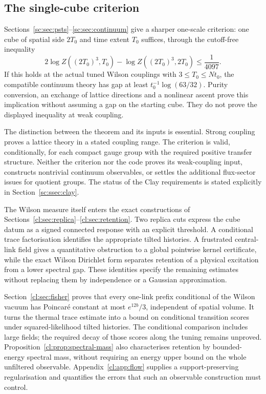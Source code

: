 \subsection{The single-cube criterion}
Sections~\ref{sc:sec:psts}--\ref{sc:sec:continuum}
give a sharper one-scale criterion: one cube of spatial side $2T_0$ and
time extent $T_0$ suffices, through the cutoff-free inequality
\[
2\log Z((2T_0)^3,T_0)-\log Z((2T_0)^3,2T_0)\le\frac1{4097}.
\]
If this holds at the actual tuned Wilson couplings with $3\le T_0\le Nt_0$,
the compatible continuum theory has gap at least
$t_0^{-1}\log(63/32)$. Purity conversion, an exchange of lattice directions
and a nonlinear ascent prove this implication without assuming a gap on
the starting cube. They do not prove the displayed inequality at weak
coupling.

The distinction between the theorem and its inputs is essential. Strong
coupling proves a lattice theory in a stated coupling range. The
criterion is valid, conditionally, for each compact gauge group with the
required positive transfer structure. Neither the criterion nor the code
proves its weak-coupling input, constructs nontrivial continuum observables,
or settles the additional flux-sector issues for quotient groups. The
status of the Clay requirements is stated explicitly in
Section~\ref{sc:ssec:clay}.

The Wilson measure itself enters the exact constructions of
Sections~\ref{cl:sec:replica}--\ref{cl:sec:retention}. Two replica cuts
express the cube datum as a signed connected response with an explicit
threshold. A conditional trace factorisation identifies the appropriate
tilted histories. A frustrated central-link field gives a quantitative
obstruction to a global pointwise kernel certificate, while the exact
Wilson Dirichlet form separates retention of a physical excitation from
a lower spectral gap. These identities specify the remaining estimates
without replacing them by independence or a Gaussian approximation.


Section~\ref{cl:sec:fisher} proves that every one-link prefix conditional
of the Wilson vacuum has Poincar\'e constant at most $e^{12b}/3$, independent
of spatial volume. It turns the thermal trace estimate into a bound on
conditional transition scores under squared-likelihood tilted histories.
The conditional comparison includes large fields; the required decay of
those scores along the tuning remains unproved. Proposition~\ref{cl:prop:spectral-mass}
also characterises retention by bounded-energy spectral mass, without
requiring an energy upper bound on the whole unfiltered observable.
Appendix~\ref{cl:app:flow} supplies a support-preserving regularisation
and quantifies the errors that such an observable construction must control.

